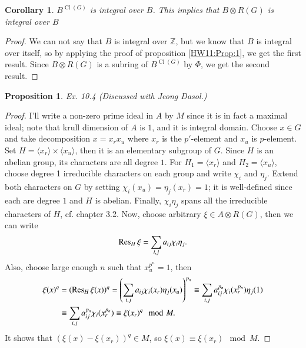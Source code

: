 \documentclass[a4paper, 12pt]{article}
\theoremstyle{Mydefinition}
\theoremstyle{Mytheorem}
\newtheorem{corollary}[statement]{Corollary}
\newtheorem{proposition}[statement]{Proposition}
\DeclareMathOperator{\cl}{Cl}
\begin{document}
\begin{corollary}\label{HW11:Cor:4}
$B^{\cl(G)}$ is integral over $B$. This implies that $B\otimes R(G)$ is integral over $B$
\end{corollary}
\begin{proof}
We can not say that $B$ is integral over $\mathbb{Z}$, but we know that $B$ is integral over itself, so by applying the proof of proposition \ref{HW11:Prop:1}, we get the first result. Since $B\otimes R(G)$ is a subring of $B^{\cl(G)}$ by $\Phi$, we get the second result. 
\end{proof}

\begin{proposition}
Ex. 10.4 (Discussed with Jeong Dasol.)
\end{proposition}
\begin{proof}
I'll write a non-zero prime ideal in $A$ by $M$ since it is in fact a maximal ideal; note that krull dimension of $A$ is $1$, and it is integral domain. Choose $x\in G$ and take decomposition $x=x_rx_u$ where $x_r$ is the $p'$-element and $x_u$ is $p$-element. Set $H = \langle x_r\rangle \times \langle x_u\rangle$, then it is an elementary subgroup of $G$. Since $H$ is an abelian group, its characters are all degree $1$. For $H_1 = \langle x_r\rangle$ and $H_2 = \langle x_u\rangle$, choose degree 1 irreducible characters on each group and write $\chi_i$ and $\eta_j$. Extend both characters on $G$ by setting $\chi_i(x_u)=\eta_j(x_r) = 1$; it is well-defined since each are degree $1$ and $H$ is abelian. Finally, $\chi_i\eta_j$ spans all the irreducible characters of $H$, cf. chapter 3.2. Now, choose arbitrary $\xi\in A\otimes R(G)$, then we can write
\begin{equation}
    \Res_H\xi = \sum_{i,j}a_{ij}\chi_i\eta_j.
\end{equation}
Also, choose large enough $n$ such that $x_u^{p^n} = 1$, then
\begin{equation}
\begin{split}
    \xi(x)^q &= \left(\Res_H\xi(x)\right)^q = \left(\sum_{i,j}a_{ij}\chi_i(x_r)\eta_j(x_u)\right)^{p_n}\equiv \sum_{i,j}a^{p_n}_{ij}\chi_i(x_r^{p_n})\eta_j(1)\\
    &\equiv \sum_{i,j}a^{p_n}_{ij}\chi_i(x_r^{p_n}) \equiv \xi(x_r)^q\mod M.
\end{split}
\end{equation}
It shows that $(\xi(x)-\xi(x_r))^q\in M$, so $\xi(x)\equiv \xi(x_r)\mod M$.
\end{proof}
\end{document}

